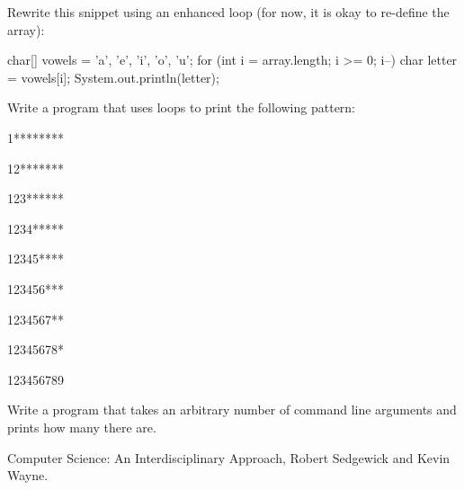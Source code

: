 \begin{exercise}
Rewrite this snippet using an enhanced  loop (for now, it is okay to re-define the array):

\begin{code}
char[] vowels = {'a', 'e', 'i', 'o', 'u'};
for (int i = array.length; i >= 0; i--) {
    char letter = vowels[i];
    System.out.println(letter);
}
\end{code}
\end{exercise}

\begin{exercise}
Write a program that uses  loops to print the following pattern:

\begin{code}
1********

12*******

123******

1234*****

12345****

123456***

1234567**

12345678*

123456789
\end{code}
\end{exercise}

\begin{exercise}
Write a program  that takes an arbitrary number of command line arguments and prints how many there are.
\end{exercise}


Computer Science: An Interdisciplinary Approach, Robert Sedgewick and Kevin Wayne.
